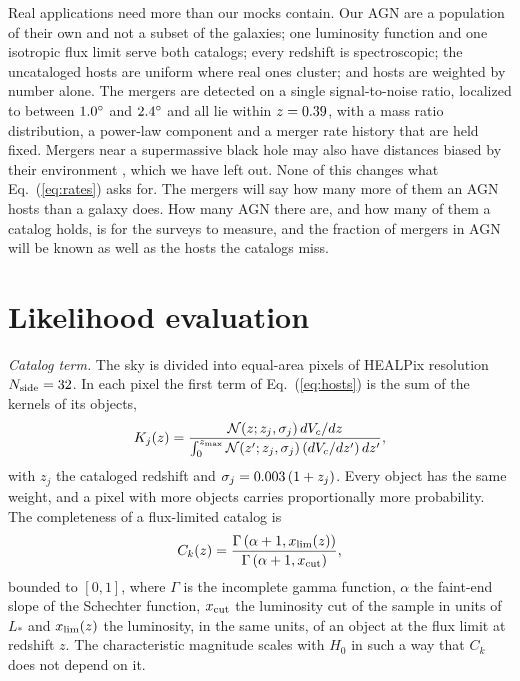 \documentclass[aps,prd,reprint,twocolumn,superscriptaddress,nofootinbib,floatfix]{revtex4-2}
\begin{document}
Real applications need more than our mocks contain. Our AGN are a
population of their own and not a subset of the galaxies; one luminosity
function and one isotropic flux limit serve both catalogs; every redshift is
spectroscopic; the uncataloged hosts are uniform where real ones cluster;
and hosts are weighted by number alone. The mergers are detected on a single
signal-to-noise ratio, localized to between $1.0^\circ$ and
$2.4^\circ$ and all lie within $z=0.39$, with a mass
ratio distribution, a power-law component and a merger rate history that are
held fixed. Mergers near a supermassive black hole may also have distances
biased by their environment \cite{Li:2025eig,Liodis:2026xvs}, which we have
left out. None of this changes what Eq.~(\ref{eq:rates}) asks for. The
mergers will say how many more of them an AGN hosts than a galaxy does. How
many AGN there are, and how many of them a catalog holds, is for the surveys
to measure, and the fraction of mergers in AGN will be known as well as the
hosts the catalogs miss.


\appendix

\section{Likelihood evaluation}
\label{app:like}

\textit{Catalog term.} The sky is divided into equal-area pixels of HEALPix
resolution $N_{\rm side}=32$. In each pixel the first term of
Eq.~(\ref{eq:hosts}) is the sum of the kernels of its objects,
\begin{equation}
K_j(z)=\frac{\mathcal{N}(z;z_j,\sigma_j)\,dV_c/dz}
{\int_0^{z_{\rm max}}\mathcal{N}(z';z_j,\sigma_j)\,(dV_c/dz')\,dz'} ,
\label{eq:kernel}
\end{equation}
with $z_j$ the cataloged redshift and $\sigma_j=0.003\,(1+z_j)$. Every
object has the same weight, and a pixel with more objects carries
proportionally more probability. The completeness of a flux-limited catalog
is
\begin{equation}
C_k(z)=\frac{\Gamma\left(\alpha+1,x_{\rm lim}(z)\right)}
{\Gamma\left(\alpha+1,x_{\rm cut}\right)} ,
\label{eq:completeness}
\end{equation}
bounded to $[0,1]$, where $\Gamma$ is the incomplete gamma function,
$\alpha$ the faint-end slope of the Schechter function, $x_{\rm cut}$ the
luminosity cut of the sample in units of $L_\ast$ and $x_{\rm lim}(z)$ the
luminosity, in the same units, of an object at the flux limit at redshift
$z$. The characteristic magnitude scales with $H_0$ in such a way that $C_k$
does not depend on it.
\end{document}
